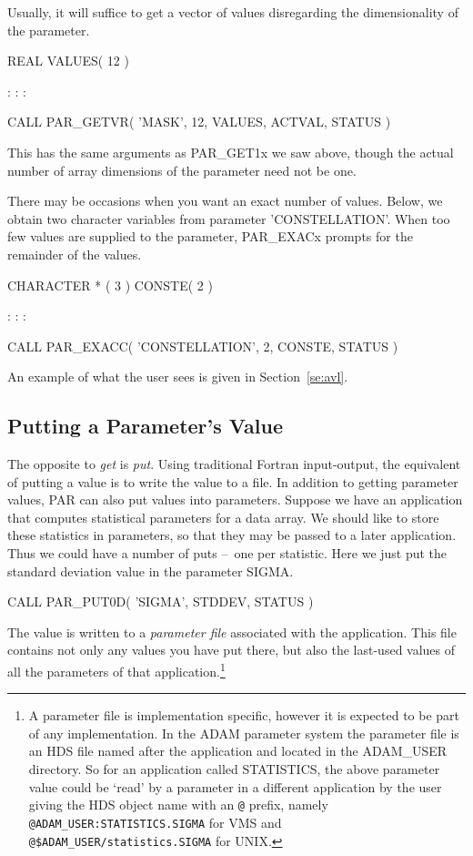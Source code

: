 \documentclass[twoside,11pt,nolof]{starlink}
\providecommand{\dash}{--}
\begin{document}
Usually, it will suffice to get a vector of values disregarding
the dimensionality of the parameter.

\begin{terminalv}
      REAL VALUES( 12 )

          :       :       :

      CALL PAR_GETVR( 'MASK', 12, VALUES, ACTVAL, STATUS )
\end{terminalv}

This has the same arguments as PAR\_GET1x we saw above, though the actual
number of array dimensions of the parameter need not be one.

There may be occasions when you want an exact number of values.
Below, we obtain two character variables from parameter 'CONSTELLATION'.
When too few values are supplied to the parameter, PAR\_EXACx
prompts for the remainder of the values.

\begin{terminalv}
      CHARACTER * ( 3 ) CONSTE( 2 )

          :       :       :

      CALL PAR_EXACC( 'CONSTELLATION', 2, CONSTE, STATUS )
\end{terminalv}

An example of what the user sees is given in Section~\ref{se:avl}.

\subsection{Putting a Parameter's Value}

The opposite to \emph{get\/} is \emph{put}.  Using traditional Fortran
input-output, the equivalent of putting a value is to write the value to
a file.  In addition to getting parameter values, PAR can also put
values into parameters.  Suppose we have an application that computes
statistical parameters for a data array.  We should like to store these
statistics in parameters, so that they may be passed to a later
application.  Thus we could have a number of puts \dash\ one per statistic.
Here we just put the standard deviation value in the parameter SIGMA.

\begin{terminalv}
      CALL PAR_PUT0D( 'SIGMA', STDDEV, STATUS )
\end{terminalv}

The value is written to a \emph{parameter file\/} associated with the
application.  This file contains not only any values you have put there,
but also the last-used values of all the parameters of that
application.\footnote{A parameter file is implementation specific,
however it is expected to be part of any implementation.  In the ADAM
parameter system the parameter file is an HDS file named after the
application and located in the ADAM\_USER directory. So for an application
called STATISTICS, the above parameter value could be `read' by a
parameter in a different application by the user giving the HDS object
name with an \texttt{@} prefix, namely \texttt{@ADAM\_USER:STATISTICS.SIGMA}
for VMS and \texttt{@\$ADAM\_USER/statistics.SIGMA} for UNIX.}
\end{document}
